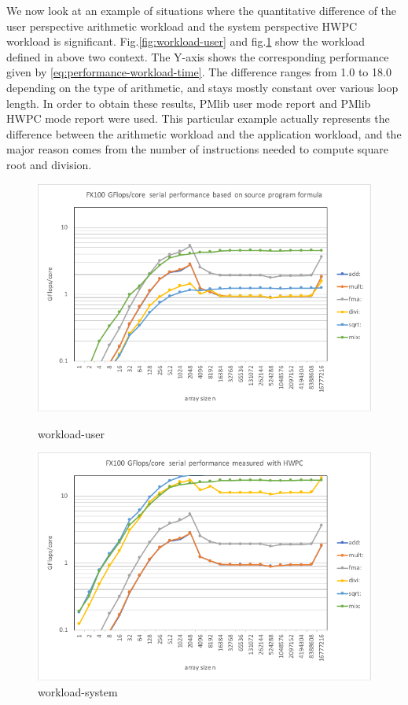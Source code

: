 \documentclass[conference]{IEEEtran}
\begin{document}
We now look at an example of situations where the quantitative difference of
the user perspective arithmetic workload and
the system perspective HWPC workload is significant.
Fig.\ref{fig:workload-user} and fig.\ref{fig:workload-system} show
the workload defined in above two context. The Y-axis shows the
corresponding performance given by \eqref{eq:performance-workload-time}.
The difference ranges from 1.0 to 18.0 depending on the type of
arithmetic, and stays mostly constant over various loop length.
In order to obtain these results, PMlib user mode report and PMlib HWPC mode
report were used.
This particular example actually represents the
difference between the arithmetic workload and the application workload,
and the major reason comes from the number of instructions needed to
compute square root and division.
\begin{figure}[tb]
\begin{minipage}{0.49\hsize}
\includegraphics[width=\textwidth]{figs/workload-user.pdf}
\caption{workload-user}
\label{fig:workload-user}
\end{minipage}
\begin{minipage}{0.49\hsize}
\includegraphics[width=\textwidth]{figs/workload-system.pdf}
\caption{workload-system}
\label{fig:workload-system}
\end{minipage}
\end{figure}
\end{document}
